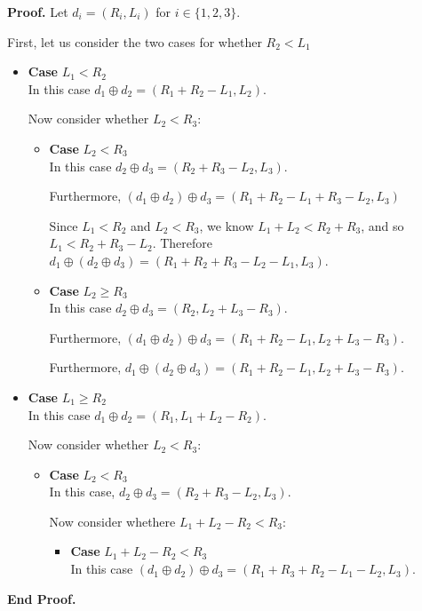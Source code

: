 \documentclass{article}
\newcommand{\combine}[2]{{#1} \oplus {#2}}
\newcommand{\setof}[1]{\{{#1}\}}
\newenvironment{proof}{\noindent\textbf{Proof.}}{\noindent\textbf{End Proof.}}
\newenvironment{caseblock}{\begin{itemize}}{\end{itemize}}
\newenvironment{case}[1]{\item \textbf{Case} {#1}\\}{}
\begin{document}
\begin{proof}
  Let $d_i = (R_i, L_i)$ for $i \in \setof{1,2,3}$. 

  First, let us consider the two cases for whether $R_2 < L_1$
  \begin{caseblock}
    \begin{case}{$L_1 < R_2$}
      In this case $\combine{d_1}{d_2} = (R_1 + R_2 - L_1, L_2)$. 

      Now consider whether $L_2 < R_3$: 
      \begin{caseblock}
        \begin{case}{$L_2 < R_3$}
          In this case $\combine{d_2}{d_3} = (R_2 + R_3 - L_2, L_3)$. 

          Furthermore, $\combine{(\combine{d_1}{d_2})}{d_3} = (R_1 + R_2 - L_1 + R_3 - L_2, L_3)$

          Since $L_1 < R_2$ and $L_2 < R_3$, we know $L_1 + L_2 < R_2 + R_3$, and so 
          $L_1 < R_2 + R_3 - L_2$. Therefore $\combine{d_1}{(\combine{d_2}{d_3})} = (R_1 + R_2 + R_3 - L_2 - L_1, L_3)$. 
        \end{case}

        \begin{case}{$L_2 \geq R_3$}
          In this case $\combine{d_2}{d_3} = (R_2, L_2 + L_3 - R_3)$. 

          Furthermore, $\combine{(\combine{d_1}{d_2})}{d_3} = (R_1 + R_2 - L_1, L_2 + L_3 - R_3)$. 

          Furthermore, $\combine{d_1}{(\combine{d_2}{d_3})} = (R_1 + R_2 - L_1, L_2 + L_3 - R_3)$. 
        \end{case}
      \end{caseblock}
    \end{case}

    \begin{case}{$L_1 \geq R_2$}
      In this case $\combine{d_1}{d_2} = (R_1, L_1 + L_2 - R_2)$. 

      Now consider whether $L_2 < R_3$: 
      \begin{caseblock}
        \begin{case}{$L_2 < R_3$}
          In this case, $\combine{d_2}{d_3} = (R_2 + R_3 - L_2, L_3)$. 

          Now consider whethere $L_1 + L_2 - R_2 < R_3$: 
          \begin{caseblock}
            \begin{case}{$L_1 + L_2 - R_2 < R_3$}
              In this case $\combine{(\combine{d_1}{d_2})}{d_3} = (R_1 + R_3 + R_2 - L_1 - L_2, L_3)$.
              

\end{case}
\end{caseblock}
\end{case}
\end{caseblock}
\end{case}
\end{caseblock}
\end{proof}
\end{document}
